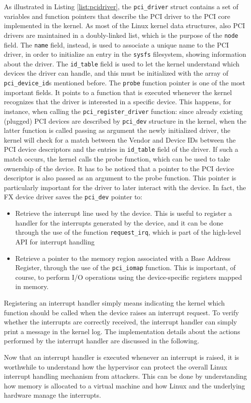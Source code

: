 As illustrated in Listing \ref{list:pcidriver}, the \texttt{pci\_driver} struct contains a set of variables and function pointers that describe the PCI driver to the PCI core implemented in the kernel. As most of the Linux kernel data structures, also PCI drivers are maintained in a doubly-linked list, which is the purpose of the \texttt{node} field. The \texttt{name} field, instead, is used to associate a unique name to the PCI driver, in order to initialize an entry in the \texttt{sysfs} filesystem, showing information about the driver. The \texttt{id\_table} field is used to let the kernel understand which devices the driver can handle, and this must be initialized with the array of \texttt{pci\_device\_id}s mentioned before. The \texttt{probe} function pointer is one of the most important fields. It points to a function that is executed whenever the kernel recognizes that the driver is interested in a specific device. This happens, for instance, when calling the \texttt{pci\_register\_driver} function: since already existing (plugged) PCI devices are described by \texttt{pci\_dev} structure in the kernel, when the latter function is called passing as argument the newly initialized driver, the kernel will check for a match between the Vendor and Device IDs between the PCI device descriptors and the entries in \texttt{id\_table} field of the driver. If such a match occurs, the kernel calls the probe function, which can be used to take ownership of the device. It has to be noticed that a pointer to the PCI device descriptor is also passed as an argument to the probe function. This pointer is particularly important for the driver to later interact with the device. In fact, the FX device driver saves the \texttt{pci\_dev} pointer to: 
\begin{itemize}
    \item Retrieve the interrupt line used by the device. This is useful to register a handler for the interrupts generated by the device, and it can be done through the use of the function \texttt{request\_irq}, which is part of the high-level API for interrupt handling 
    \item Retrieve a pointer to the memory region associated with a Base Address Register, through the use of the \texttt{pci\_iomap} function. This is important, of course, to perform I/O operations using the device-specific registers mapped in memory. 
\end{itemize}
Registering an interrupt handler simply means indicating the kernel which function should be called when the device raises an interrupt request. To verify whether the interrupts are correctly received, the interrupt handler can simply print a message in the kernel log. The implementation details about the actions performed by the interrupt handler are discussed in the following. 
\par 
Now that an interrupt handler is executed whenever an interrupt is raised, it is worthwhile to understand how the hypervisor can protect the overall Linux interrupt handling mechanism from attackers. This can be done by understanding how memory is allocated to a virtual machine and how Linux and the underlying hardware manage the interrupts.
